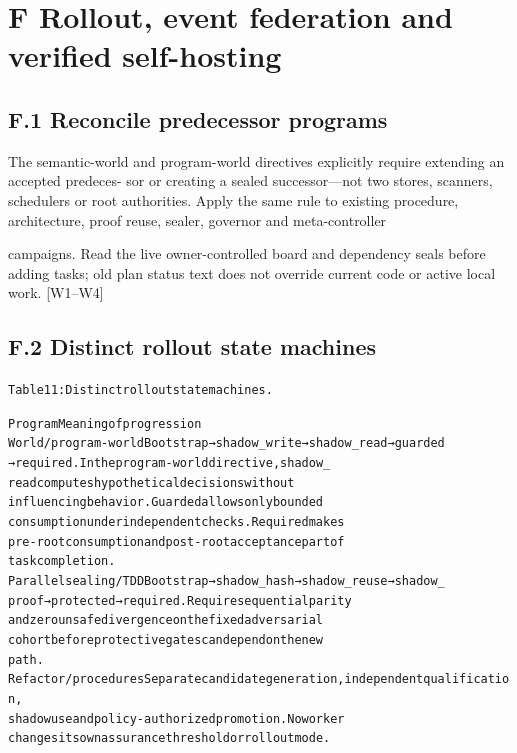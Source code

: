 \documentclass{article}
\begin{document}
\section*{F Rollout, event federation and verified self-hosting}
\subsection*{F.1 Reconcile predecessor programs}

The semantic-world and program-world directives explicitly require extending an accepted predeces-
sor or creating a sealed successor—not two stores, scanners, schedulers or root authorities. Apply
the same rule to existing procedure, architecture, proof reuse, sealer, governor and meta-controller


campaigns. Read the live owner-controlled board and dependency seals before adding tasks; old plan
status text does not override current code or active local work. [W1–W4]

\subsection*{F.2 Distinct rollout state machines}

\begingroup\fontsize{7}{8.4}\selectfont
\begin{alltt}
Table 11: Distinct rollout state machines.
\end{alltt}\endgroup

\begingroup\fontsize{7}{8.4}\selectfont
\begin{alltt}
Program                                      Meaning of progression
World / program-world                        Bootstrap → shadow\_write → shadow\_read → guarded
                                             → required. In the program-world directive, shadow\_
                                             read computes hypothetical decisions without
                                             influencing behavior. Guarded allows only bounded
                                             consumption under independent checks. Required makes
                                             pre-root consumption and post-root acceptance part of
                                             task completion.
Parallel sealing / TDD                       Bootstrap → shadow\_hash → shadow\_reuse → shadow\_
                                             proof → protected → required. Require sequential parity
                                             and zero unsafe divergence on the fixed adversarial
                                             cohort before protective gates can depend on the new
                                             path.
Refactor / procedures                        Separate candidate generation, independent qualification,
                                             shadow use and policy-authorized promotion. No worker
                                             changes its own assurance threshold or rollout mode.
\end{alltt}\endgroup
\end{document}

